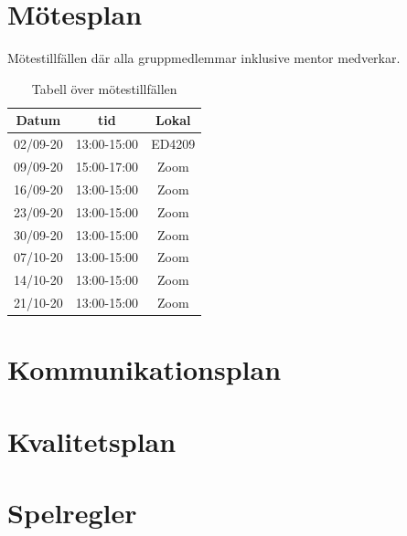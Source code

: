 \documentclass[a4paper]{article}
\begin{document}
\section{Mötesplan}

Mötestillfällen där alla gruppmedlemmar inklusive mentor medverkar.

\begin{table}[H]
    \begin{center}
        \begin{tabular}{ |c|c|c| }\hline
            Datum & tid & Lokal \\\hline\hline
            02/09-20 & 13:00-15:00 & ED4209 \\\hline
            09/09-20 & 15:00-17:00 & Zoom \\\hline
            16/09-20 & 13:00-15:00 & Zoom \\\hline
            23/09-20 & 13:00-15:00 & Zoom \\\hline
            30/09-20 & 13:00-15:00 & Zoom \\\hline
            07/10-20 & 13:00-15:00 & Zoom \\\hline
            14/10-20 & 13:00-15:00 & Zoom \\\hline
            21/10-20 & 13:00-15:00 & Zoom \\\hline
        \end{tabular}
        \caption{Tabell över mötestillfällen}
        \label{motesplan}
    \end{center}
\end{table}

\section{Kommunikationsplan}

\section{Kvalitetsplan}

\section{Spelregler}



\end{document}
